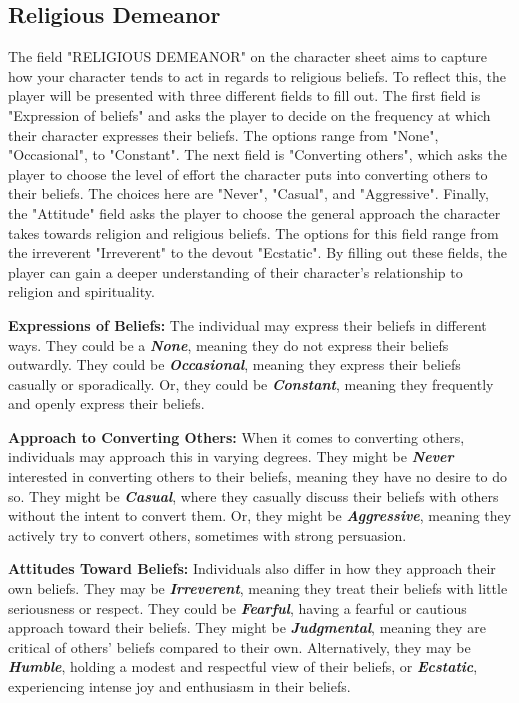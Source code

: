 \documentclass[12pt]{book}  %
\begin{document}
\subsection{\textbf{Religious Demeanor}}

The field "RELIGIOUS DEMEANOR" on the character sheet aims to capture how your character tends to act in regards to religious beliefs. To reflect this, the player will be presented with three different fields to fill out. The first field is "Expression of beliefs" and asks the player to decide on the frequency at which their character expresses their beliefs. The options range from "None", "Occasional", to "Constant". The next field is "Converting others", which asks the player to choose the level of effort the character puts into converting others to their beliefs. The choices here are "Never", "Casual", and "Aggressive". Finally, the "Attitude" field asks the player to choose the general approach the character takes towards religion and religious beliefs. The options for this field range from the irreverent "Irreverent" to the devout "Ecstatic". By filling out these fields, the player can gain a deeper understanding of their character's relationship to religion and spirituality.

\textbf{Expressions of Beliefs:} The individual may express their beliefs in different ways. They could be a \textbf{\textit{None}}, meaning they do not express their beliefs outwardly. They could be \textbf{\textit{Occasional}}, meaning they express their beliefs casually or sporadically. Or, they could be \textbf{\textit{Constant}}, meaning they frequently and openly express their beliefs.

\textbf{Approach to Converting Others:} When it comes to converting others, individuals may approach this in varying degrees. They might be \textbf{\textit{Never}} interested in converting others to their beliefs, meaning they have no desire to do so. They might be \textbf{\textit{Casual}}, where they casually discuss their beliefs with others without the intent to convert them. Or, they might be \textbf{\textit{Aggressive}}, meaning they actively try to convert others, sometimes with strong persuasion.

\textbf{Attitudes Toward Beliefs:} Individuals also differ in how they approach their own beliefs. They may be \textbf{\textit{Irreverent}}, meaning they treat their beliefs with little seriousness or respect. They could be \textbf{\textit{Fearful}}, having a fearful or cautious approach toward their beliefs. They might be \textbf{\textit{Judgmental}}, meaning they are critical of others’ beliefs compared to their own. Alternatively, they may be \textbf{\textit{Humble}}, holding a modest and respectful view of their beliefs, or \textbf{\textit{Ecstatic}}, experiencing intense joy and enthusiasm in their beliefs.
\end{document}
